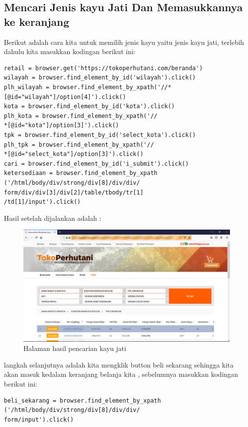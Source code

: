\newpage 
\subsection{Mencari Jenis kayu Jati Dan Memasukkannya ke keranjang }
Berikut adalah cara kita untuk memilih jenis kayu yaitu jenis kayu jati, terlebih dahulu kita masukkan kodingan berikut ini: 
\begin{verbatim}
retail = browser.get('https://tokoperhutani.com/beranda')
wilayah = browser.find_element_by_id('wilayah').click()
plh_wilayah = browser.find_element_by_xpath('//*
[@id="wilayah"]/option[4]').click()
kota = browser.find_element_by_id('kota').click()
plh_kota = browser.find_element_by_xpath('//
*[@id="kota"]/option[3]').click()
tpk = browser.find_element_by_id('select_kota').click()
plh_tpk = browser.find_element_by_xpath('//
*[@id="select_kota"]/option[3]').click()
cari = browser.find_element_by_id('i_submit').click()
ketersediaan = browser.find_element_by_xpath
('/html/body/div/strong/div[8]/div/div/
form/div/div[3]/div[2]/table/tbody/tr[1]
/td[1]/input').click()
\end{verbatim}

Hasil setelah dijalankan adalah : 
\begin{figure}[h]
	\centering
	\includegraphics[scale=0.25]{figures/carikayu1}
	\caption{Halaman hasil pencarian kayu jati}
\end{figure}

\newpage
langkah selanjutnya adalah kita mengklik button beli sekarang sehingga kita akan masuk kedalam keranjang belanja kita , sebelumnya masukkan kodingan berikut ini: 
\begin{verbatim}
beli_sekarang = browser.find_element_by_xpath
('/html/body/div/strong/div[8]/div/div/
form/input').click()
\end{verbatim}

